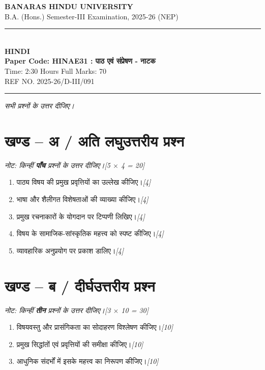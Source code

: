 \documentclass[11pt,a4paper]{article}
\newcommand{\pts}[1]{\hfill \textit{[#1]}}
\begin{document}
\begin{center}
  {\large\bfseries BANARAS HINDU UNIVERSITY}\\[2pt]
  {\normalsize B.A. (Hons.) Semester-III Examination, 2025-26 (NEP)}\\[6pt]
  \rule{0.8\linewidth}{0.5pt}\\[6pt]
  {\large\bfseries HINDI}\\[4pt]
  {\large\bfseries Paper Code: HINAE31 : पाठ एवं संप्रेषण - नाटक}\\[4pt]
  {\normalsize Time: 2:30 Hours \hfill Full Marks: 70}\\[2pt]
  {\small REF NO. 2025-26/D-III/091}
\end{center}
\rule{\linewidth}{0.4pt}
\smallskip


\noindent \textit{सभी प्रश्नों के उत्तर दीजिए।}

\bigskip

\section*{खण्ड -- अ / अति लघुउत्तरीय प्रश्न}
\noindent \textit{नोट: किन्हीं \textbf{पाँच} प्रश्नों के उत्तर दीजिए।}\pts{5 $\times$ 4 = 20}

\begin{enumerate}[label=\textbf{(\ क\ )},leftmargin=*,itemsep=6pt]
  \item[\textbf{(क)}] पाठ्य विषय की प्रमुख प्रवृत्तियों का उल्लेख कीजिए।\pts{4}
  \item[\textbf{(ख)}] भाषा और शैलीगत विशेषताओं की व्याख्या कीजिए।\pts{4}
  \item[\textbf{(ग)}] प्रमुख रचनाकारों के योगदान पर टिप्पणी लिखिए।\pts{4}
  \item[\textbf{(घ)}] विषय के सामाजिक-सांस्कृतिक महत्त्व को स्पष्ट कीजिए।\pts{4}
  \item[\textbf{(ङ)}] व्यावहारिक अनुप्रयोग पर प्रकाश डालिए।\pts{4}
\end{enumerate}

\bigskip

\section*{खण्ड -- ब / दीर्घउत्तरीय प्रश्न}
\noindent \textit{नोट: किन्हीं \textbf{तीन} प्रश्नों के उत्तर दीजिए।}\pts{3 $\times$ 10 = 30}

\begin{enumerate}[label=\textbf{\arabic*.},leftmargin=*,itemsep=12pt]
  \item विषयवस्तु और प्रासंगिकता का सोदाहरण विश्लेषण कीजिए।\pts{10}
  \item प्रमुख सिद्धांतों एवं प्रवृत्तियों की समीक्षा कीजिए।\pts{10}
  \item आधुनिक संदर्भों में इसके महत्त्व का निरूपण कीजिए।\pts{10}
\end{enumerate}
\end{document}
